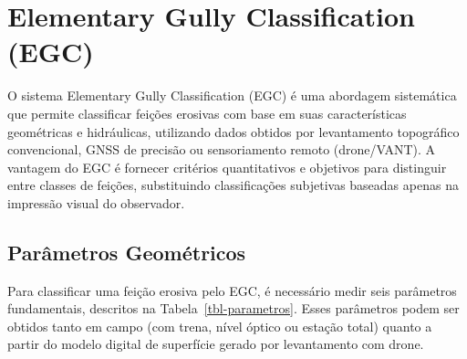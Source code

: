 \documentclass[
  portuguese,
  11pt,
  a4paper,
  open=any]{scrbook}
\begin{document}
\section{Elementary Gully Classification
(EGC)}\label{elementary-gully-classification-egc}

O sistema Elementary Gully Classification (EGC) é uma abordagem
sistemática que permite classificar feições erosivas com base em suas
características geométricas e hidráulicas, utilizando dados obtidos por
levantamento topográfico convencional, GNSS de precisão ou sensoriamento
remoto (drone/VANT). A vantagem do EGC é fornecer critérios
quantitativos e objetivos para distinguir entre classes de feições,
substituindo classificações subjetivas baseadas apenas na impressão
visual do observador.

\subsection{Parâmetros Geométricos}\label{paruxe2metros-geomuxe9tricos}

Para classificar uma feição erosiva pelo EGC, é necessário medir seis
parâmetros fundamentais, descritos na Tabela~\ref{tbl-parametros}. Esses
parâmetros podem ser obtidos tanto em campo (com trena, nível óptico ou
estação total) quanto a partir do modelo digital de superfície gerado
por levantamento com drone.
\end{document}
